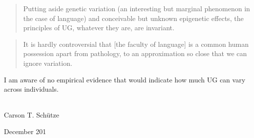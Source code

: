 \begin{refsection}
\begin{quote}
Putting aside genetic variation (an interesting but marginal phenomenon in the case of language) and conceivable but unknown epigenetic effects, the principles of UG, whatever they are, are invariant. \citep[35]{Chomsky2013}
\end{quote}

\begin{quote}
It is hardly controversial that [the faculty of language] is a common human possession apart from pathology, to an approximation so close that we can ignore variation. \citep[138]{Chomsky2008}
\end{quote}

\noindent I am aware of no empirical evidence that would indicate how much UG can vary across individuals.\\\\
\begin{minipage}{.45\linewidth}
	\begin{flushleft}
		\noindent Carson T. Schütze 
	\end{flushleft}
\end{minipage}
\begin{minipage}{.54\linewidth}
	\begin{flushright}
		\noindent December 201
	\end{flushright}
\end{minipage}
\nocite{Phillips2006}
\printbibliography[heading=prefacebib]
\end{refsection}
